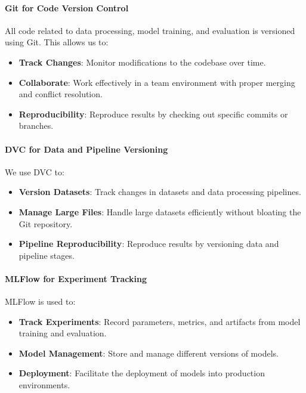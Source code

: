 \documentclass[12pt, a4paper]{article}
\begin{document}
\paragraph{Git for Code Version Control}

All code related to data processing, model training, and evaluation is versioned using Git. This allows us to:

\begin{itemize}
    \item \textbf{Track Changes}: Monitor modifications to the codebase over time.
    \item \textbf{Collaborate}: Work effectively in a team environment with proper merging and conflict resolution.
    \item \textbf{Reproducibility}: Reproduce results by checking out specific commits or branches.
\end{itemize}

\paragraph{DVC for Data and Pipeline Versioning}

We use DVC to:

\begin{itemize}
    \item \textbf{Version Datasets}: Track changes in datasets and data processing pipelines.
    \item \textbf{Manage Large Files}: Handle large datasets efficiently without bloating the Git repository.
    \item \textbf{Pipeline Reproducibility}: Reproduce results by versioning data and pipeline stages.
\end{itemize}

\paragraph{MLFlow for Experiment Tracking}

MLFlow is used to:

\begin{itemize}
    \item \textbf{Track Experiments}: Record parameters, metrics, and artifacts from model training and evaluation.
    \item \textbf{Model Management}: Store and manage different versions of models.
    \item \textbf{Deployment}: Facilitate the deployment of models into production environments.
\end{itemize}
\end{document}
